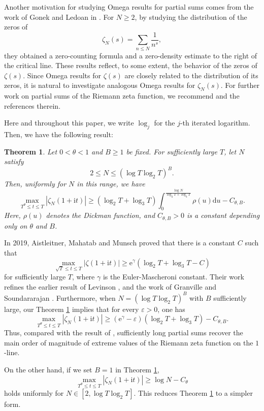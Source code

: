 \documentclass[12pt,reqno]{amsart}
\newtheorem{thm}{Theorem}[section]
\theoremstyle{definition}
\numberwithin{equation}{section}
\newcommand{\lo}{\log_2}
\newcommand{\lt}{\log_3}
\newcommand{\mmd}{\mathrm{d}}
\newcommand{\mme}{\mathrm{e}}
\newcommand{\mit}{\mathrm{i}t}
\begin{document}
Another motivation for studying Omega results for partial sums comes from the work of Gonek and Ledoan in \cite{gonek2010IMRN}. For \(N \ge 2\), by studying the distribution of the zeros of 
\[
\zeta_N(s) = \sum_{n \le N}\frac{1}{n^s},
\]
they obtained a zero-counting formula and a zero-density estimate to the right of the critical line. These results reflect, to some extent, the behavior of the zeros of \(\zeta(s)\). Since Omega results for \(\zeta(s)\) are closely related to the distribution of its zeros, it is natural to investigate analogous Omega results for \(\zeta_N(s)\). For further work on partial sums of the Riemann zeta function, we recommend \cite{BS2018BLMS,levinson1973USA,Roy2019Adv} and the references therein.

Here and throughout this paper, we write \(\log_j\) for the \(j\)-th iterated logarithm. Then, we have the following result:
\begin{thm}
    \label{thm1}
    Let \( 0<\theta<1\) and \(B \ge 1\) be fixed. For sufficiently large \(T\), let \(N\) satisfy
    \[
    2 \le N \le (\log T \lo T)^B.
    \]
    Then, uniformly for \(N\) in this range, we have
    \[
    \max_{T^\theta \le t \le T}|\zeta_N(1+\mit)| \ge  (\lo T+\lt T) \int_{0}^{\frac{\log N}{\lo T+\lt T}} \rho(u) \mmd u- C_{\theta,B}.
    \]
    Here, \(\rho(u)\) denotes the Dickman function, and \(C_{\theta,B}>0\) is a constant depending only on \(\theta\) and \(B\).
\end{thm}

In 2019, Aistleitner, Mahatab and Munsch \cite{aistleitner2019IMRN} proved that there is a constant \(C\) such that
\[
\max_{\sqrt{T} \le t \le T} |\zeta(1+\mit)| \ge \mme^\gamma(\lo T+\lt T-C)
\]
for sufficiently large \(T\), where \(\gamma\) is the Euler-Mascheroni constant. Their work refines the earlier result of Levinson \cite{levinson1972AA}, and the work of Granville and Soundararajan \cite{Gran06extreme}. Furthermore, when \(N= (\log T \lo T)^B\) with \(B\) sufficiently large, our Theorem \ref{thm1} implies that for every \(\varepsilon>0\), one has
\[
\max_{T^\theta \le t \le T}|\zeta_N(1+\mit)| \ge (\mme^\gamma-\varepsilon)(\lo T+\lt T) - C_{\theta,B}.
\]
Thus, compared with the result of \cite{aistleitner2019IMRN}, sufficiently long partial sums recover the main order of magnitude of extreme values of the Riemann zeta function on the \(1\)-line.

On the other hand, if we set \(B=1\) in Theorem \ref{thm1}, 
\[
\max_{T^\theta \le t \le T}|\zeta_N(1+\mit)| \ge \log N -C_\theta
\]
holds uniformly for \(N \in [2, \log T \lo T]\). This reduces Theorem \ref{thm1} to a simpler form.
\end{document}
